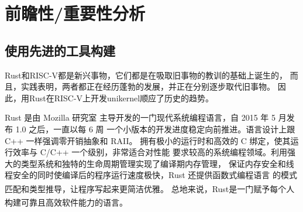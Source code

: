 \documentclass[UTF8,fontset=none,linespread=1.15]{ctexart}
\let\nosupcite\cite
\renewcommand*{\cite}[1]{\textsuperscript{\nosupcite{#1}}}
\begin{document}

\section{前瞻性/重要性分析}

\subsection{使用先进的工具构建}

Rust和RISC-V都是新兴事物，它们都是在吸取旧事物的教训的基础上诞生的，
而且，实践表明，两者都正在经历蓬勃的发展，并正在分别逐步取代旧事物。
因此，用Rust在RISC-V上开发unikernel顺应了历史的趋势。

Rust 是由 Mozilla 研究室
主导开发的一门现代系统编程语言，自 2015 年 5 月发布 1.0 之后，一直以每 6 周
一个小版本的开发进度稳定向前推进。语言设计上跟 C++ 一样强调零开销抽象和 RAII。
拥有极小的运行时和高效的 C 绑定，使其运行效率与 C/C++ 一个级别，非常适合对性能
要求较高的系统编程领域。利用强大的类型系统和独特的生命周期管理实现了编译期内存管理，
保证内存安全和线程安全的同时使编译后的程序运行速度极快，Rust 还提供函数式编程语言
的模式匹配和类型推导，让程序写起来更简洁优雅。\cite{bib:2-why-rust}
总地来说，Rust是一门赋予每个人 构建可靠且高效软件能力的语言。\cite{bib:1-rust-lang}
\end{document}
